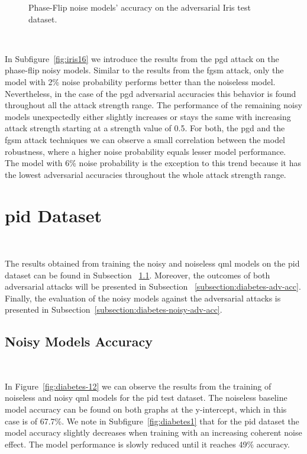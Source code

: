 \begin{figure}[!h]
  \caption{Phase-Flip noise models' accuracy on the adversarial Iris test dataset.}
  \label{fig:iris-1516}
\end{figure} \

In Subfigure~\ref{fig:iris16} we introduce the results from the \ac{pgd}
attack on the phase-flip noisy models. Similar to the results from the
\ac{fgsm} attack, only the model with 2\% noise probability performs
better than the noiseless model. Nevertheless, in the case of the \ac{pgd}
adversarial accuracies this behavior is found throughout all the attack
strength range. The performance of the remaining noisy models unexpectedly
either slightly increases or stays the same with increasing attack strength
starting at a strength value of 0.5. For both, the \ac{pgd} and the
\ac{fgsm} attack techniques we can observe a small correlation between the
model robustness, where a higher noise probability equals lesser model
performance. The model with 6\% noise probability is the exception to
this trend because it has the lowest adversarial accuracies throughout
the whole attack strength range. \

\section{\acl{pid} Dataset}\label{section:diabetes-eval} \

The results obtained from training the noisy and noiseless
\ac{qml} models on the \ac{pid} dataset can be found in Subsection
~\ref{subsection:diabetes-noisy-acc}. Moreover, the outcomes
of both adversarial attacks will be presented in Subsection
~\ref{subsection:diabetes-adv-acc}. Finally, the evaluation
of the noisy models against the adversarial attacks is
presented in Subsection~\ref{subsection:diabetes-noisy-adv-acc}. \

\subsection{Noisy Models Accuracy}\label{subsection:diabetes-noisy-acc} \

In Figure~\ref{fig:diabetes-12} we can observe the results
from the training of noiseless and noisy \ac{qml} models
for the \ac{pid} test dataset. The noiseless baseline model accuracy
can be found on both graphs at the y-intercept, which in
this case is of 67.7\%. We note in Subfigure~\ref{fig:diabetes1}
that for the \ac{pid} dataset the model accuracy slightly decreases
when training with an increasing coherent noise effect. The model
performance is slowly reduced until it reaches 49\% accuracy. \

